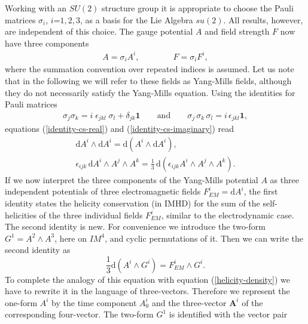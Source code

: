 \documentclass[10pt]{iopart}
\def \d{\mbox{d}}
\def \Minkowski{I\!\!M}
\def \text{\mbox}
\def \Eq{equation }
\def \bA{{\mathbf{A}}}
\def \indi{i}
\def \indj{j}
\def \indk{k}
\begin{document}
Working with  an $SU(2)$ structure group it is appropriate to choose the
Pauli matrices $\sigma_i$, $i$=$1,2,3$, as a 
basis for the Lie Algebra $su(2)$.
All results, however, are independent of this
choice. The gauge potential $A$ and field strength $F$ now have 
three components
\begin{eqnarray}
   A = \sigma_\indi A^\indi, \qquad\qquad   F = \sigma_\indi F^\indi, 
                             \label{SU-two-AandF} 
\end{eqnarray}
where the summation convention over repeated indices is assumed.
Let us note that in the following 
we will refer to these fields as Yang-Mills fields, 
although they do not necessarily satisfy the Yang-Mills equation.
Using the identities for Pauli matrices
\begin{eqnarray}
    \sigma_j\sigma_k = i\;\epsilon_{jkl}\;\sigma_l + \delta_{jk}
    \mathbf{1}
    \qquad \text{and} \qquad
    \sigma_j\,\sigma_k\,\sigma_l = i\,\epsilon_{jkl} \mathbf{1},  
  \label{Pauli-matrices-identities}
\end{eqnarray}
equations (\ref{identity-cs-real}) and (\ref{identity-cs-imaginary}) read
\begin{eqnarray}
  \d A^\indi \wedge \d A^\indi
               = \d (A^\indi \wedge \d A^\indi),\\ 
 \epsilon_{\indi \indj\indk }\, \d A^\indi \wedge A^\indj \wedge A^\indk = 
 \frac{1}{3}\, \d (\epsilon_{\indi \indj\indk }
                      A^\indi \wedge A^\indj \wedge A^\indk ).
\end{eqnarray}
If we now interpret the three components of the Yang-Mills potential
$A$ as
three independent potentials of three electromagnetic fields 
$F_{EM}^\indi = \d A^\indi$,
the first identity states the helicity conservation (in IMHD)
for the sum of the self-helicities of the three individual
fields $F_{EM}^\indi$, similar to the electrodynamic case.
The second identity is new.
For convenience we introduce the two-form $G^1 = A^2 \wedge A^3$,
here on $\Minkowski^4$,
and cyclic permutations of it. 
Then we can write the second identity as
\begin{equation}
   \frac{1}{3}\d(A^i\wedge G^i) = F_{EM}^i \wedge G^i.\label{Second-identity}
\end{equation}
To complete the analogy of this equation with
\Eq (\ref{helicity-density}) we have to rewrite it in the language of
three-vectors. Therefore we represent the one-form $A^i$ by the time
component $A_0^i$ and the three-vector $\bA^i$ of the corresponding
four-vector. The two-form $G^1$ is identified with the vector pair
\end{document}

